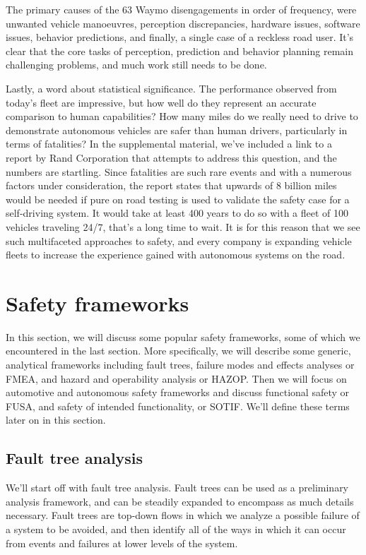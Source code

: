 The primary causes of the 63 Waymo disengagements in order of frequency, were unwanted vehicle manoeuvres, perception discrepancies, 
hardware issues, software issues, behavior predictions, and finally, a single case of a reckless road user. 
It's clear that the core tasks of perception, prediction and behavior planning remain challenging problems, and much work still needs to be done. 

Lastly, a word about statistical significance. The performance observed from today's fleet are impressive, but how well do they represent 
an accurate comparison to human capabilities? How many miles do we really need to drive to demonstrate autonomous vehicles are safer than human drivers, 
particularly in terms of fatalities? In the supplemental material, we've included a link to a report by Rand Corporation that attempts 
to address this question, and the numbers are startling. Since fatalities are such rare events and with a numerous factors under consideration, 
the report states that upwards of 8 billion miles would be needed if pure on road testing is used to validate the safety case for a self-driving system. 
It would take at least 400 years to do so with a fleet of 100 vehicles traveling 24/7, that's a long time to wait. 
It is for this reason that we see such multifaceted approaches to safety, and every company is expanding vehicle fleets to increase the experience gained with autonomous systems on the road. 


\section{Safety frameworks}
In this section, we will discuss some popular safety frameworks, some of which we encountered in the last section. 
More specifically, we will describe some generic, analytical frameworks including fault trees, failure modes and effects analyses or FMEA, 
and hazard and operability analysis or HAZOP. Then we will focus on automotive and autonomous safety frameworks and discuss functional safety or FUSA, 
and safety of intended functionality, or SOTIF. We'll define these terms later on in this section. 


\subsection{Fault tree analysis}

We'll start off with fault tree analysis. 
Fault trees can be used as a preliminary analysis framework, and can be steadily expanded to encompass as much details necessary. 
Fault trees are top-down flows in which we analyze a possible failure of a system to be avoided, and then identify all of the ways in 
which it can occur from events and failures at lower levels of the system. 

